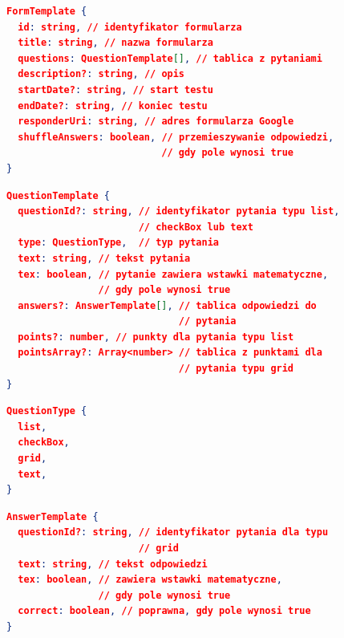 \begin{figure}[H]
  \begin{lstlisting}[language=json,firstnumber=1]
FormTemplate {
  id: string, // identyfikator formularza
  title: string, // nazwa formularza
  questions: QuestionTemplate[], // tablica z pytaniami
  description?: string, // opis
  startDate?: string, // start testu
  endDate?: string, // koniec testu
  responderUri: string, // adres formularza Google
  shuffleAnswers: boolean, // przemieszywanie odpowiedzi,
                           // gdy pole wynosi true
}
  \end{lstlisting}
\end{figure}
\begin{figure}[H]
  \begin{lstlisting}[language=json,firstnumber=1]
QuestionTemplate {
  questionId?: string, // identyfikator pytania typu list, 
                       // checkBox lub text
  type: QuestionType,  // typ pytania
  text: string, // tekst pytania
  tex: boolean, // pytanie zawiera wstawki matematyczne, 
                // gdy pole wynosi true
  answers?: AnswerTemplate[], // tablica odpowiedzi do 
                              // pytania
  points?: number, // punkty dla pytania typu list
  pointsArray?: Array<number> // tablica z punktami dla 
                              // pytania typu grid
}
  \end{lstlisting}
\end{figure}
\begin{figure}[H]
  \begin{lstlisting}[language=json,firstnumber=1]
QuestionType {
  list,
  checkBox,
  grid,
  text,
}
  \end{lstlisting}
\end{figure}
\begin{figure}[H]
  \begin{lstlisting}[language=json,firstnumber=1]
AnswerTemplate {
  questionId?: string, // identyfikator pytania dla typu 
                       // grid
  text: string, // tekst odpowiedzi
  tex: boolean, // zawiera wstawki matematyczne, 
                // gdy pole wynosi true
  correct: boolean, // poprawna, gdy pole wynosi true
}
  \end{lstlisting}
\end{figure}

